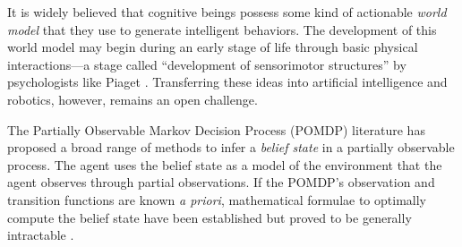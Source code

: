 \documentclass[runningheads]{llncs}
\begin{document}
It is widely believed that cognitive beings possess some kind of actionable \textit{world model} that they use to generate intelligent behaviors.
The development of this world model may begin during an early stage of life through basic physical inter\-actions---a stage called ``development of sensorimotor structures'' by psychologists like Piaget \cite[p. 104]{dolle_pour_2005}. 
Transferring these ideas into artificial intelligence and robotics, however,  remains an open challenge.



The Partially Observable Markov Decision Process (POMDP) literature has proposed a broad range of methods to infer a \textit{belief state} in a partially observable process.
The agent uses the belief state as a model of the environment that the agent observes through partial observations.  
If 
the POMDP's observation and transition functions are known \textit{a priori}, 
mathematical formulae to optimally compute the belief state have been established but proved to be generally intractable %
\cite{kaelbling1998planning}. 
\end{document}
